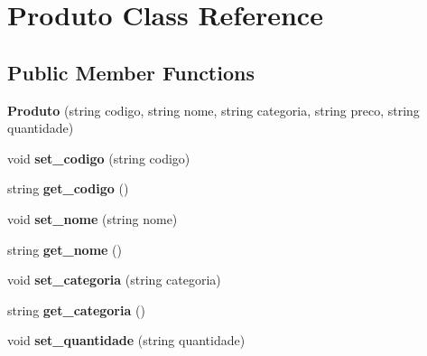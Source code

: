 \hypertarget{class_produto}{}\section{Produto Class Reference}
\label{class_produto}
\subsection*{Public Member Functions}
\begin{DoxyCompactItemize}
\item 
{\bfseries Produto} (string codigo, string nome, string categoria, string preco, string quantidade)\hypertarget{class_produto_a513cd996c33046f28ce973f61c68ea7e}{}\label{class_produto_a513cd996c33046f28ce973f61c68ea7e}

\item 
void {\bfseries set\+\_\+codigo} (string codigo)\hypertarget{class_produto_ab6816364c76995c529bdbb1d3d6999ac}{}\label{class_produto_ab6816364c76995c529bdbb1d3d6999ac}

\item 
string {\bfseries get\+\_\+codigo} ()\hypertarget{class_produto_a5fee389ee57a450e988a6ebc9e6db157}{}\label{class_produto_a5fee389ee57a450e988a6ebc9e6db157}

\item 
void {\bfseries set\+\_\+nome} (string nome)\hypertarget{class_produto_a55230e3937d26a09b2a143a2c2d5173d}{}\label{class_produto_a55230e3937d26a09b2a143a2c2d5173d}

\item 
string {\bfseries get\+\_\+nome} ()\hypertarget{class_produto_af3226ae7eafdec16f13f266464be7596}{}\label{class_produto_af3226ae7eafdec16f13f266464be7596}

\item 
void {\bfseries set\+\_\+categoria} (string categoria)\hypertarget{class_produto_a10b0890a8448b51ac46d8c2bc461d3d8}{}\label{class_produto_a10b0890a8448b51ac46d8c2bc461d3d8}

\item 
string {\bfseries get\+\_\+categoria} ()\hypertarget{class_produto_a4983d87d5c8672a7d867d063e1d1755e}{}\label{class_produto_a4983d87d5c8672a7d867d063e1d1755e}

\item 
void {\bfseries set\+\_\+quantidade} (string quantidade)\hypertarget{class_produto_a2bc9a6c48b870d99bc16da38fb738a36}{}\label{class_produto_a2bc9a6c48b870d99bc16da38fb738a36}


\end{DoxyCompactItemize}
